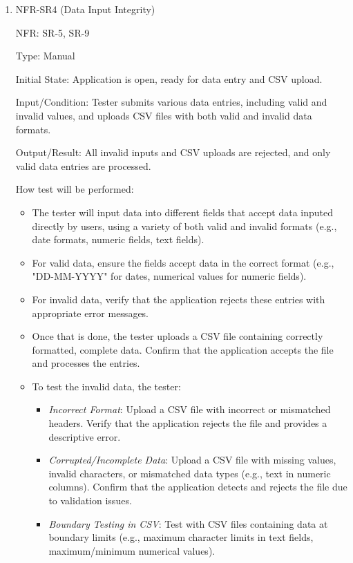 \documentclass[12pt, titlepage]{article}
\begin{document}
\begin{enumerate}
\item{NFR-SR4 (Data Input Integrity)\\}
  
  NFR: SR-5, SR-9
  
  Type: Manual
  
  Initial State: Application is open, ready for data entry and CSV upload.
  
  Input/Condition: Tester submits various data entries, including valid and invalid values,
  and uploads CSV files with both valid and invalid data formats.
  
  Output/Result: All invalid inputs and CSV uploads are rejected, and only valid data entries
  are processed.

  How test will be performed: 
  \begin{itemize}
    \item The tester will input data into different fields that accept data inputed directly by
    users, using a variety of both valid and invalid formats (e.g., date formats, numeric fields,
    text fields).
    \item For valid data, ensure the fields accept data in the correct format (e.g., "DD-MM-YYYY"
    for dates, numerical values for numeric fields).
    \item For invalid data, verify that the application rejects these entries with appropriate
    error messages.
    \item Once that is done, the tester uploads a CSV file containing correctly formatted,
    complete data. Confirm that the application accepts the file and processes the entries.
    \item To test the invalid data, the tester:
    \begin{itemize}
      \item \emph{Incorrect Format}: Upload a CSV file with incorrect or mismatched headers.
      Verify that the application rejects the file and provides a descriptive error.
      \item \emph{Corrupted/Incomplete Data}: Upload a CSV file with missing values,
      invalid characters, or mismatched data types (e.g., text in numeric columns).
      Confirm that the application detects and rejects the file due to validation issues.
      \item \emph{Boundary Testing in CSV}: Test with CSV files containing data at boundary
      limits (e.g., maximum character limits in text fields, maximum/minimum numerical values).
    \end{itemize}
  \end{itemize}


\end{enumerate}
\end{document}
